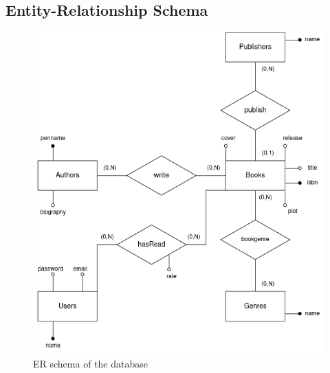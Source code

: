 \subsection{Entity-Relationship Schema}

\begin{figure}
    \centering
    \includegraphics[width=0.85\linewidth]{DBbookrec4.png}
    \caption{ER schema of the database}
    \label{fig:enter-label}
\end{figure}



